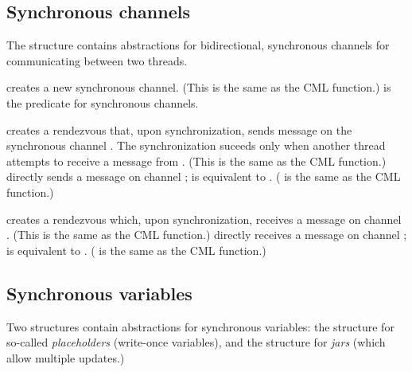 \subsection{Synchronous channels}

The  structure contains abstractions for
bidirectional, synchronous channels for communicating between two
threads.
%
\begin{protos}
\end{protos}
%
 creates a new synchronous channel.  (This is the
same as the CML  function.)   is the
predicate for synchronous channels.
%
\begin{protos}
\end{protos}
%
 creates a rendezvous that, upon synchronization, sends
message  on the synchronous channel .  The
synchronization suceeds only when another thread attempts to receive a
message from .  (This is the same as the CML
 function.)   directly sends a message
 on channel ;  is
equivalent to .  ( is the
same as the CML  function.)
%
\begin{protos}
\end{protos}
%
 creates a rendezvous which, upon synchronization,
receives a message on channel .  (This is the same as
the CML  function.)   directly
receives a message on channel ;  is
equivalent to .  ( is
the same as the CML  function.)

\subsection{Synchronous variables}

Two structures contain abstractions for synchronous variables: the
 structure for so-called
\textit{placeholders} (write-once variables), and the
 structure for \textit{jars} (which allow
multiple updates.)

